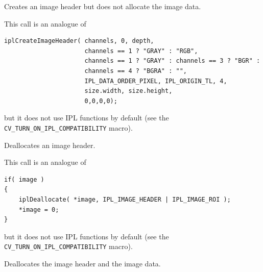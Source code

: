 \label{CreateImageHeader}

Creates an image header but does not allocate the image data.


\begin{description}
\end{description}

This call is an analogue of

\begin{lstlisting}
iplCreateImageHeader( channels, 0, depth,
                      channels == 1 ? "GRAY" : "RGB",
                      channels == 1 ? "GRAY" : channels == 3 ? "BGR" :
                      channels == 4 ? "BGRA" : "",
                      IPL_DATA_ORDER_PIXEL, IPL_ORIGIN_TL, 4,
                      size.width, size.height,
                      0,0,0,0);
\end{lstlisting}

but it does not use IPL functions by default (see the \texttt{CV\_TURN\_ON\_IPL\_COMPATIBILITY} macro).

\label{ReleaseImageHeader}

Deallocates an image header.


\begin{description}
\end{description}

This call is an analogue of

\begin{lstlisting}
if( image )
{
    iplDeallocate( *image, IPL_IMAGE_HEADER | IPL_IMAGE_ROI );
    *image = 0;
}
\end{lstlisting}

but it does not use IPL functions by default (see the \texttt{CV\_TURN\_ON\_IPL\_COMPATIBILITY} macro).


\label{ReleaseImage}

Deallocates the image header and the image data.

